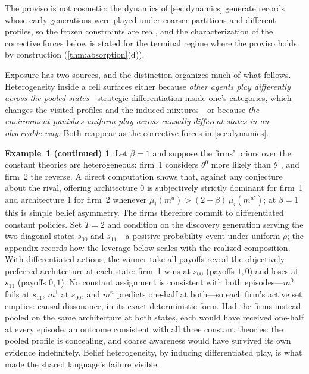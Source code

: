 \documentclass[11pt]{article}
\theoremstyle{definition}
\newtheorem*{excont}{Example~1 (continued)}
\begin{document}
The proviso is not cosmetic: the dynamics of \cref{sec:dynamics} generate
records whose early generations were played under coarser partitions and
different profiles, so the frozen constraints are real, and the
characterization of the corrective forces below is stated for the terminal
regime where the proviso holds by construction (\cref{thm:absorption}(d)).

Exposure has two sources, and the distinction organizes much of what
follows.  Heterogeneity inside a cell surfaces either because \emph{other
agents play differently across the pooled states}---strategic
differentiation inside one's categories, which changes the visited profiles
and the induced mixtures---or because \emph{the environment punishes uniform
play across causally different states in an observable way}.  Both reappear
as the corrective forces in \cref{sec:dynamics}.

\begin{excont}
Let $\beta=1$ and suppose the firms' priors over the constant theories are
heterogeneous: firm~1 considers $\theta^0$ more likely than $\theta^1$, and
firm~2 the reverse.  A direct computation shows that, against any conjecture
about the rival, offering architecture $0$ is subjectively strictly dominant
for firm~1 and architecture $1$ for firm~2 whenever
$\mu_i(m^a)>(2-\beta)\,\mu_i(m^{a'})$; at $\beta=1$ this is simple belief
asymmetry.  The firms therefore commit to differentiated constant policies.  Set $T=2$
and condition on the discovery generation serving the two diagonal states
$s_{00}$ and $s_{11}$---a positive-probability event under uniform $\rho$; the
appendix records how the leverage below scales with the realized composition.
With differentiated actions, the winner-take-all payoffs reveal the
objectively preferred architecture at each state: firm~1 wins at $s_{00}$
(payoffs $1,0$) and loses at $s_{11}$ (payoffs $0,1$).  No constant assignment
is consistent with both episodes---$m^0$ fails at $s_{11}$, $m^1$ at $s_{00}$,
and $m^n$ predicts one-half at both---so each firm's active set empties:
causal dissonance, in its exact deterministic form.  Had the firms instead
pooled on the same architecture at both states, each would have received
one-half at every episode, an outcome consistent with all three constant
theories: the pooled profile is concealing, and coarse awareness would have
survived its own evidence indefinitely.  Belief heterogeneity, by inducing
differentiated play, is what made the shared language's failure visible.
\end{excont}
\end{document}
